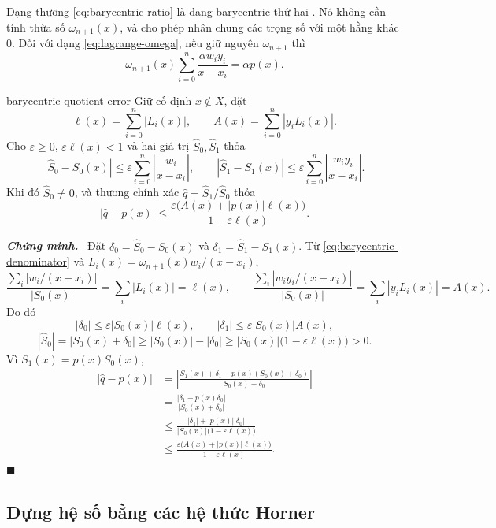 \documentclass[12pt,a4paper,oneside]{book}
\numberwithin{algorithm}{chapter}
\theoremstyle{definition}
\newenvironment{chungminh}{\par\medskip\noindent\textbf{\textit{\color{mainblue}Chứng minh.}}\ }{\hfill$\blacksquare$\par\medskip}
\begin{document}
Dạng thương \eqref{eq:barycentric-ratio} là dạng barycentric thứ hai \cite{berrut}. Nó không cần tính thừa số $\omega_{n+1}(x)$, và cho phép nhân chung các trọng số với một hằng khác $0$. Đối với dạng \eqref{eq:lagrange-omega}, nếu giữ nguyên $\omega_{n+1}$ thì
\[
 \omega_{n+1}(x)\sum_{i=0}^n\frac{\alpha w_iy_i}{x-x_i}
 =\alpha p(x).
\]

\begin{menhde}{}{barycentric-quotient-error}
Giữ cố định $x\notin X$, đặt
\[
 \ell(x)=\sum_{i=0}^n|L_i(x)|,\qquad
 A(x)=\sum_{i=0}^n|y_iL_i(x)|.
\]
Cho $\varepsilon\geq0$, $\varepsilon\ell(x)<1$ và hai giá trị $\widehat S_0,\widehat S_1$ thỏa
\[
 |\widehat S_0-S_0(x)|\leq\varepsilon\sum_{i=0}^n\left|\frac{w_i}{x-x_i}\right|,
 \qquad
 |\widehat S_1-S_1(x)|\leq\varepsilon\sum_{i=0}^n\left|\frac{w_iy_i}{x-x_i}\right|.
\]
Khi đó $\widehat S_0\ne0$, và thương chính xác $\widehat q=\widehat S_1/\widehat S_0$ thỏa
\[
 |\widehat q-p(x)|
 \leq\frac{\varepsilon\bigl(A(x)+|p(x)|\ell(x)\bigr)}{1-\varepsilon\ell(x)}.
\]
\end{menhde}
\begin{chungminh}
Đặt $\delta_0=\widehat S_0-S_0(x)$ và $\delta_1=\widehat S_1-S_1(x)$. Từ \eqref{eq:barycentric-denominator} và $L_i(x)=\omega_{n+1}(x)w_i/(x-x_i)$,
\[
 \frac{\sum_i|w_i/(x-x_i)|}{|S_0(x)|}=\sum_i|L_i(x)|=\ell(x),
 \qquad
 \frac{\sum_i|w_iy_i/(x-x_i)|}{|S_0(x)|}=\sum_i|y_iL_i(x)|=A(x).
\]
Do đó
\[
 |\delta_0|\leq\varepsilon|S_0(x)|\ell(x),\qquad
 |\delta_1|\leq\varepsilon|S_0(x)|A(x),
\]
\[
 |\widehat S_0|=|S_0(x)+\delta_0|
 \geq|S_0(x)|-|\delta_0|
 \geq|S_0(x)|\bigl(1-\varepsilon\ell(x)\bigr)>0.
\]
Vì $S_1(x)=p(x)S_0(x)$,
\begin{align*}
 |\widehat q-p(x)|
 &=\left|\frac{S_1(x)+\delta_1-p(x)(S_0(x)+\delta_0)}{S_0(x)+\delta_0}\right|\\
 &=\frac{|\delta_1-p(x)\delta_0|}{|S_0(x)+\delta_0|}\\
 &\leq\frac{|\delta_1|+|p(x)||\delta_0|}{|S_0(x)|\bigl(1-\varepsilon\ell(x)\bigr)}\\
 &\leq\frac{\varepsilon\bigl(A(x)+|p(x)|\ell(x)\bigr)}{1-\varepsilon\ell(x)}.
\end{align*}
\end{chungminh}

\subsection{Dựng hệ số bằng các hệ thức Horner}
\end{document}
